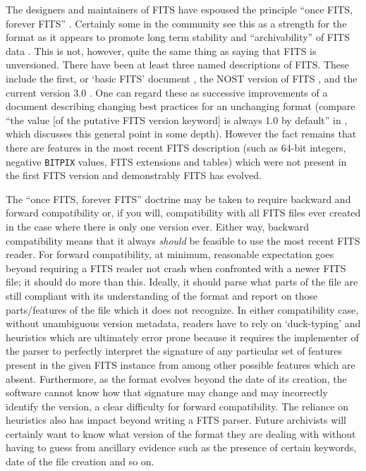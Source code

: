 \documentclass[final,authoryear,5p,times,twocolumn]{elsarticle}
\begin{document}
{{The designers and maintainers of FITS have espoused the principle
``once FITS, forever FITS''
\citep[see e.g.,][]{1988A&AS...73..359G,1993FITS1}.  Certainly some in the
community see this as a strength for the format as it appears to
promote long term stability and ``archivability'' of FITS data
\citep{2012EWASSAlle,2012LOC}.  This is not, however, quite the same
thing as saying that FITS is unversioned.  There have been at least
three named descriptions of FITS.  These include the first, or `basic
FITS' document \citep{1979ipia.coll..445W,1981A&AS...44..363W}, the
NOST version of FITS \citep{2001A&A...376..359H}, and the current
version 3.0 \citep{2010A&A...524A..42P}.  One can regard these as
successive improvements of a document describing changing best
practices for an unchanging format (compare ``the value [of the
putative FITS version keyword] is always 1.0 by default'' in
\citet{1997ASPC..125..257W}, which discusses this general point in
some depth). However the fact remains that there are features in the
most recent FITS description (such as 64-bit integers, negative
\texttt{BITPIX} values, FITS extensions and tables) which were not
present in the first FITS version and demonstrably FITS has evolved.


The ``once FITS, forever FITS'' doctrine may be taken to require
backward and forward compatibility or, if you will, compatibility
with all FITS files ever created in the case where there is only
one version ever.
Either way, backward compatibility means that it always
\emph{should} be feasible to use the most recent FITS reader. For
forward compatibility, at minimum, reasonable expectation goes
beyond requiring a FITS reader not crash when confronted with a newer
FITS file; it should do more than this. Ideally, it should parse
what parts of the file are still compliant with
its understanding of the format and report on those parts/features
of the file which it does not recognize. In either compatibility case,
without unambiguous version metadata, readers have to rely on `duck-typing'
and heuristics which are ultimately error prone because it requires
the implementer of the parser to perfectly interpret the signature
of any particular set of features present in the given FITS instance
from among other possible features which are absent. Furthermore, as
the format evolves beyond the date of its creation, the software cannot
know how that signature may change and may incorrectly
identify the version, a clear difficulty for forward compatibility.
The reliance on heuristics also has impact beyond writing a FITS parser.
Future archivists will certainly want to know what version of the
format they are dealing with without having to guess from ancillary
evidence such as the presence of certain keywords, date of the file
creation and so on.


}}
\end{document}
